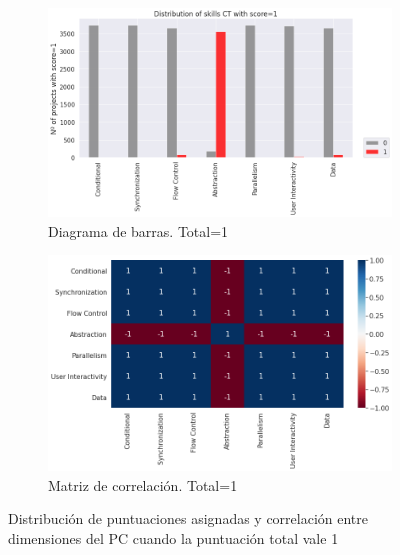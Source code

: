 \documentclass[a4paper, 12pt]{book}
\begin{document}
\begin{figure}[H]
    \centering
    \begin{subfigure}[h]{.49\textwidth} 
        \includegraphics[width=\textwidth]{img/distribucion_1_Snap}
        \caption{Diagrama de barras. Total=1}
        \label{fig:total1_Snap}
    \end{subfigure}       
    \begin{subfigure}[h]{.49\textwidth} 
        \includegraphics[width=\textwidth]{img/corr_1_Snap}
        \caption{Matriz de correlación. Total=1}
        \label{fig:corr1_Snap}
    \end{subfigure}
     \caption{Distribución de puntuaciones asignadas y correlación entre dimensiones del PC cuando la puntuación total vale 1}
\end{figure}
\end{document}
